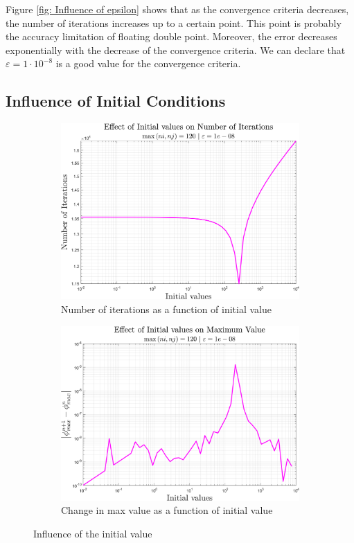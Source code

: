 \documentclass[11pt, a4paper]{article}
\begin{document}
Figure \ref{fig: Influence of epsilon} shows that as the convergence criteria decreases, the number of iterations increases up to a certain point. This point is probably the accuracy limitation of floating double point. Moreover, the error decreases exponentially with the decrease of the convergence criteria. We can declare that $\varepsilon=1\cdot10^{-8}$ is a good value for the convergence criteria.
\subsection{Influence of Initial Conditions}
\begin{figure}[H]
    \centering
    \begin{subfigure}[c]{0.49\textwidth}
        \centering
        \includegraphics[width=\textwidth]{images/init val - n.png}
        \caption{Number of iterations as a function of initial value}
        \label{fig: n as a function of init val}
    \end{subfigure}
    \hfill
    \begin{subfigure}[c]{0.49\textwidth}
        \centering
        \includegraphics[width=\textwidth]{images/init val - max diff.png}
        \caption{Change in max value as a function of initial value}
        \label{fig: change in max value as a function of init val}
    \end{subfigure}
    \caption{Influence of the initial value}
    \label{fig: Influence of init val}
\end{figure}
\end{document}
